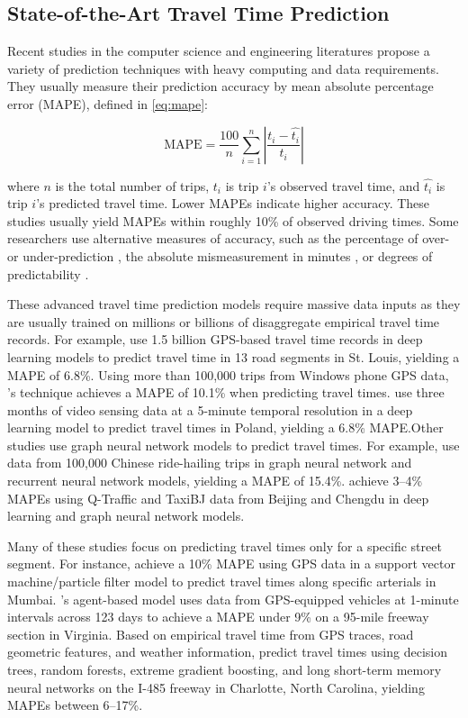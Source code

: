 \documentclass[12pt,letterpaper]{article} %
\begin{document}
\subsection{State-of-the-Art Travel Time Prediction}

Recent studies in the computer science and engineering literatures propose a variety of prediction techniques with heavy computing and data requirements. They usually measure their prediction accuracy by mean absolute percentage error (MAPE), defined in \autoref{eq:mape}:

\begin{equation}
\label{eq:mape}
\text{MAPE} = \frac{100}{n} \sum^{n}_{i=1} \left|\frac{t_i - \hat{t_i}}{t_i}\right|
\end{equation}

where $n$ is the total number of trips, $t_i$ is trip $i$'s observed travel time, and $\hat{t_i}$ is trip $i$'s predicted travel time. Lower MAPEs indicate higher accuracy.  These studies usually yield MAPEs within roughly 10\% of observed driving times. Some researchers use alternative measures of accuracy, such as the percentage of over- or under-prediction \citep{jenelius2013travel}, the absolute mismeasurement in minutes \citep{chiabaut2021traffic}, or degrees of predictability \citep{li2019travel}.

These advanced travel time prediction models require massive data inputs as they are usually trained on millions or billions of disaggregate empirical travel time records. For example, \citet{hou2018network} use 1.5 billion GPS-based travel time records in deep learning models to predict travel time in 13 road segments in St. Louis, yielding a MAPE of 6.8\%. Using more than 100,000 trips from Windows phone GPS data, \citet{woodard2017predicting}'s technique achieves a MAPE of 10.1\% when predicting travel times. \citet{pamula2023estimation} use three months of video sensing data at a 5-minute temporal resolution in a deep learning model to predict travel times in Poland, yielding a 6.8\% MAPE.\@ Other studies use graph neural network models to predict travel times. For example, \citet{wang2023dynamic} use data from 100,000 Chinese ride-hailing trips in graph neural network and recurrent neural network models, yielding a MAPE of 15.4\%. \citet{vankdoth2023deep} achieve 3--4\% MAPEs using Q-Traffic and TaxiBJ data from Beijing and Chengdu in deep learning and graph neural network models.

Many of these studies focus on predicting travel times only for a specific street segment. For instance, \citet{sharmila2019svm} achieve a 10\% MAPE using GPS data in a support vector machine/particle filter model to predict travel times along specific arterials in Mumbai. \citet{chen2016multi}'s agent-based model uses data from GPS-equipped vehicles at 1-minute intervals across 123 days to achieve a MAPE under 9\% on a 95-mile freeway section in Virginia. Based on empirical travel time from GPS traces, road geometric features, and weather information, \citet{qiu2021machine} predict travel times using decision trees, random forests, extreme gradient boosting, and long short-term memory neural networks on the I-485 freeway in Charlotte, North Carolina, yielding MAPEs between 6--17\%.
\end{document}
